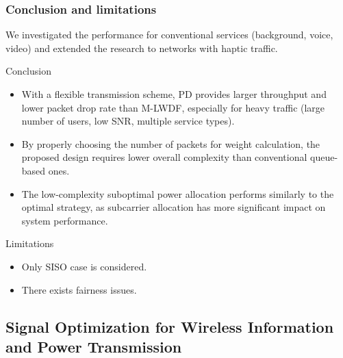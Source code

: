 \documentclass{beamer}
\begin{document}
\begin{frame}
\frametitle{Conclusion and limitations}

We investigated the performance for conventional services (background, voice, video) and extended the research to networks with haptic traffic.

\begin{block}{Conclusion}
\begin{itemize}
  \item With a flexible transmission scheme, PD provides larger throughput and lower packet drop rate than M-LWDF, especially for heavy traffic (large number of users, low SNR, multiple service types).
  \item By properly choosing the number of packets for weight calculation, the proposed design requires lower overall complexity than conventional queue-based ones.
  \item The low-complexity suboptimal power allocation performs similarly to the optimal strategy, as subcarrier allocation has more significant impact on system performance.
\end{itemize}
\end{block}

\begin{block}{Limitations}
\begin{itemize}
  \item Only SISO case is considered.
  \item There exists fairness issues.
\end{itemize}
\end{block}

\end{frame}



\subsection{Signal Optimization for Wireless Information and Power Transmission}
\end{document}
